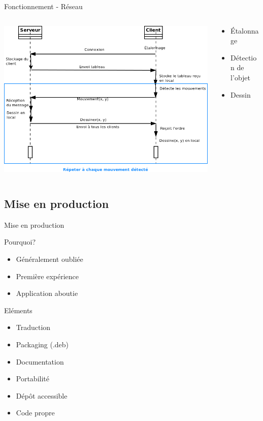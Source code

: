 \documentclass{beamer}
\begin{document}
		\begin{frame}{Fonctionnement - Réseau}
			\begin{columns}
				\begin{column}{9cm}
					\includegraphics[scale=0.35]{sequence_reseau.png}
				\end{column}
				\begin{column}{5cm}
					\begin{itemize}
						\item Étalonnage
						\item Détection de l'objet
						\item Dessin
					\end{itemize}
				\end{column}
			\end{columns}
		\end{frame}
		
		\subsection{Mise en production}
		\begin{frame}{Mise en production}
			\begin{block}{Pourquoi?}
				\begin{itemize}
					\item Généralement oubliée
					\item Première expérience
					\item Application aboutie
				\end{itemize}
			\end{block}
			\pause
			\begin{block}{Eléments}
				\begin{itemize}
					\item Traduction
					\item Packaging (.deb)
					\item Documentation
					\item Portabilité
					\item Dépôt accessible
					\item Code propre
				\end{itemize}
			\end{block}
		\end{frame}
		
\end{document}
